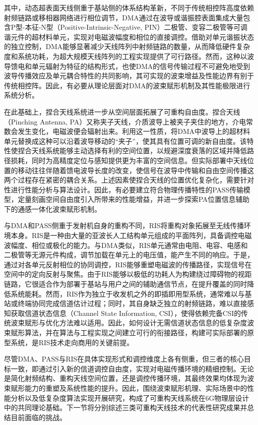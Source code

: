 其中，动态超表面天线侧重于基站侧的体系结构革新，不同于传统相控阵高度依赖射频链路或移相器网络进行相位调节，DMA通过在波导或谐振腔表面集成大量包含P型-本征-N型（Positive-Intrinsic-Negative, PIN）二极管、变容二极管等可调谐元件的超材料单元，实现对电磁波幅度和相位的直接调控。借助对单元谐振状态的独立控制，DMA能够显著减少天线阵列中射频链路的数量，从而降低硬件复杂度和系统功耗，为超大规模天线阵列的工程实现提供了可行路径。然而，这种以波导馈电和单元辐射为特征的结构形式，也使DMA的信号传输过程不可避免地受到波导传播效应及单元耦合特性的共同影响，其可实现的波束增益及性能边界有别于传统相控阵。因此，有必要从理论层面对DMA的波束赋形机制及其性能极限进行系统分析。

在此基础上，捏合天线系统进一步从空间层面拓展了可重构自由度。捏合天线（Pinching Antenna, PA）又称夹子天线，介质波导上被夹子夹住的地方，介电常数会发生变化，电磁波便会辐射出来。利用这一性质，将DMA中波导上的超材料单元替换成这种可以沿着波导移动的“夹子”，使其具有位置可调的新自由度。该特性使捏合天线系统能够主动选择有利的空间位置，以规避深度衰落的区域并降低路径损耗，同时为高精度定位与感知提供更为丰富的空间信息。但实际部署中天线位置的移动往往伴随着馈电波导长度的改变，使信号在波导中传输和自由空间传播这两个过程存在紧密的耦合关系。上述因素使捏合天线的位置优化复杂化，需要针对性进行性能分析与算法设计。因此，有必要建立符合物理传播特性的PASS传输模型，定量刻画空间自由度引入所带来的性能增益，并进一步探索PA位置信息辅助下的通感一体化波束赋形机制。

与DMA和PASS侧重于发射机自身的重构不同，RIS将重构对象拓展至无线传播环境本身。RIS是一种由大量的亚波长人工结构单元组成的平面阵列，具备调控电磁波幅度、相位或极化的能力。与DMA类似，RIS单元通常由电阻、电容、电感和二极管等无源元件构成，调节加载在单元上的电压值，能产生不同的响应。于是，通过对各单元反射相位的协同调控，RIS能够重塑电磁波的传播路径，实现信号在空间中的定向反射与聚焦。由于RIS能够以极低的功耗人为构建绕过障碍物的视距链路，它很适合作为部署于基站与用户之间的辅助通信节点，在提升覆盖的同时降低系统能耗。然而，RIS作为独立于收发机之外的即插即用型系统，通常难以与基站或终端协同完成信道估计过程；同时，其自身缺乏独立的射频链路，难以直接感知获取信道状态信息（Channel State Information, CSI），使得依赖完备CSI的传统波束赋形与优化方法难以适用。因此，如何设计无需信道状态信息的低复杂度波束赋形算法，并在算法与工程实现之间建立可行的衔接路径，构建可实际部署的原型系统，是RIS技术走向商用的关键前提。

尽管DMA、PASS与RIS在具体实现形式和调控维度上各有侧重，但三者的核心目标一致，即通过引入新的信道调控自由度，实现对电磁传播环境的精细控制。无论是简化射频结构、重构天线空间位置，还是调控传播环境，其最终效果均体现为波束赋形能力的重塑及系统性能的提升。因此，围绕波束赋形机理、实际场景中的性能分析以及低复杂度算法实现开展研究，构成了可重构天线系统在6G物理层设计中的共同理论基础。下一节将分别综述三类可重构天线技术的代表性研究成果并总结目前面临的挑战。


